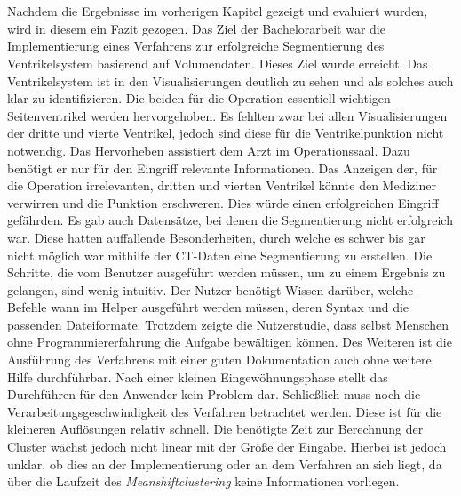 \chapter{}
\label{sec:discussion}


Nachdem die Ergebnisse im vorherigen Kapitel gezeigt und evaluiert wurden, wird in diesem ein Fazit gezogen.
\newline
Das Ziel der Bachelorarbeit war die Implementierung eines Verfahrens zur erfolgreiche Segmentierung des Ventrikelsystem basierend auf Volumendaten. Dieses Ziel wurde erreicht.
\newline
Das Ventrikelsystem ist in den Visualisierungen deutlich zu sehen und als solches auch klar zu identifizieren. Die beiden für die Operation essentiell wichtigen Seitenventrikel werden hervorgehoben.
Es fehlten zwar bei allen Visualisierungen der dritte und vierte Ventrikel, jedoch sind diese für die Ventrikelpunktion nicht notwendig. Das Hervorheben assistiert dem Arzt im Operationssaal. Dazu benötigt er nur für den Eingriff relevante Informationen. Das Anzeigen der, für die Operation irrelevanten, dritten und vierten Ventrikel könnte den Mediziner verwirren und die Punktion erschweren. Dies würde einen erfolgreichen Eingriff gefährden.
\newline
Es gab auch Datensätze, bei denen die Segmentierung nicht erfolgreich war. Diese hatten auffallende Besonderheiten, durch welche es schwer bis gar nicht möglich war mithilfe der CT-Daten eine Segmentierung zu erstellen.
\newline
Die Schritte, die vom Benutzer ausgeführt werden müssen, um zu einem Ergebnis zu gelangen, sind wenig intuitiv. Der Nutzer benötigt Wissen darüber, welche Befehle wann im Helper ausgeführt werden müssen, deren Syntax und die passenden Dateiformate.
\newline
Trotzdem zeigte die Nutzerstudie, dass selbst Menschen ohne Programmiererfahrung die Aufgabe bewältigen können. Des Weiteren ist die Ausführung des Verfahrens mit einer guten Dokumentation auch ohne weitere Hilfe durchführbar. Nach einer kleinen Eingewöhnungsphase stellt das Durchführen für den Anwender kein Problem dar.
\newline
Schließlich muss noch die Verarbeitungsgeschwindigkeit des Verfahren betrachtet werden. Diese ist für die kleineren Auflösungen relativ schnell. Die benötigte Zeit zur Berechnung der Cluster wächst jedoch nicht linear mit der Größe der Eingabe. Hierbei ist jedoch unklar, ob dies an der Implementierung oder an dem Verfahren an sich liegt, da über die Laufzeit des \textit{Meanshiftclustering} keine Informationen vorliegen.


